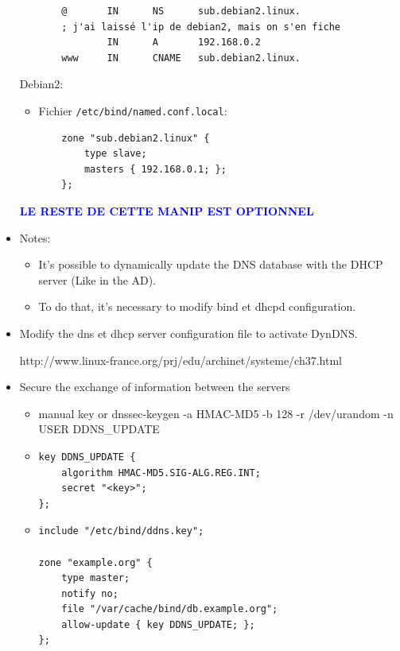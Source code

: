 \documentclass[a4paper]{article}
\begin{document}
\begin{itemize}
\begin{example}
\begin{itemize}
\begin{verbatim}
    @       IN      NS      sub.debian2.linux.
    ; j'ai laissé l'ip de debian2, mais on s'en fiche
            IN      A       192.168.0.2
    www     IN      CNAME   sub.debian2.linux.
        \end{verbatim}
    \end{itemize}
    Debian2:
    \begin{itemize}
        \item Fichier \texttt{/etc/bind/named.conf.local}:
        \begin{verbatim}
    zone "sub.debian2.linux" {
        type slave;
        masters { 192.168.0.1; };
    };
        \end{verbatim}
    \end{itemize}
\end{example}

\begin{center}
    \textcolor{blue}{\textbf{LE RESTE DE CETTE MANIP EST OPTIONNEL}}
\end{center}

\item Notes:
\begin{itemize}
    \item It's possible to dynamically update the DNS database with the DHCP server (Like in the AD).
    \item To do that, it's necessary to modify bind et dhcpd configuration.
\end{itemize}

\item Modify the dns et dhcp server configuration file to activate DynDNS.
\begin{example}
    http://www.linux-france.org/prj/edu/archinet/systeme/ch37.html
\end{example}

\item Secure the exchange of information between the servers
\begin{itemize}
    \item manual key or dnssec-keygen -a HMAC-MD5 -b 128 -r /dev/urandom -n USER DDNS\_UPDATE
    \item \begin{verbatim}
key DDNS_UPDATE {
    algorithm HMAC-MD5.SIG-ALG.REG.INT;
    secret "<key>";
};
    \end{verbatim}
    \item \begin{verbatim}
include "/etc/bind/ddns.key";

zone "example.org" {
    type master;
    notify no;
    file "/var/cache/bind/db.example.org";
    allow-update { key DDNS_UPDATE; };
};


\end{verbatim}
\end{itemize}
\end{itemize}
\end{document}
